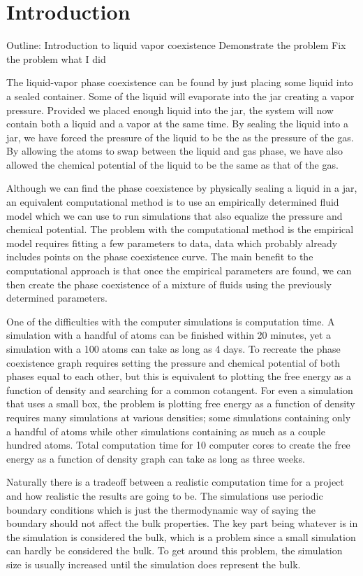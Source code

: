 \section{Introduction}
Outline:
Introduction to liquid vapor coexistence
Demonstrate the problem
Fix the problem
what I did

The liquid-vapor phase coexistence can be found by just placing some liquid into a sealed container. Some of the liquid will evaporate into the jar creating a vapor pressure. Provided we placed enough liquid into the jar, the system will now contain both a liquid and a vapor at the same time. By sealing the liquid into a jar, we have forced the pressure of the liquid to be the as the pressure of the gas. By allowing the atoms to swap between the liquid and gas phase, we have also allowed the chemical potential of the liquid to be the same as that of the gas.

Although we can find the phase coexistence by physically sealing a liquid in a jar, an equivalent computational method is to use an empirically determined fluid model which we can use to run simulations that also equalize the pressure and chemical potential. The problem with the computational method is the empirical model requires fitting a few parameters to data, data which probably already includes points on the phase coexistence curve. The main benefit to the computational approach is that once the empirical parameters are found, we can then create the phase coexistence of a mixture of fluids using the previously determined parameters.

One of the difficulties with the computer simulations is computation time. A simulation with a handful of atoms can be finished within 20 minutes, yet a simulation with a 100 atoms can take as long as 4 days. To recreate the phase coexistence graph requires setting the pressure and chemical potential of both phases equal to each other, but this is equivalent to plotting the free energy as a function of density and searching for a common cotangent. For even a simulation that uses a small box, the problem is plotting free energy as a function of density requires many simulations at various densities; some simulations containing only a handful of atoms while other simulations containing as much as a couple hundred atoms. Total computation time for 10 computer cores to create the free energy as a function of density graph can take as long as three weeks.

Naturally there is a tradeoff between a realistic computation time for a project and how realistic the results are going to be. The simulations use periodic boundary conditions which is just the thermodynamic way of saying the boundary should not affect the bulk properties. The key part being whatever is in the simulation is considered the bulk, which is a problem since a small simulation can hardly be considered the bulk. To get around this problem, the simulation size is usually increased until the simulation does represent the bulk. 

